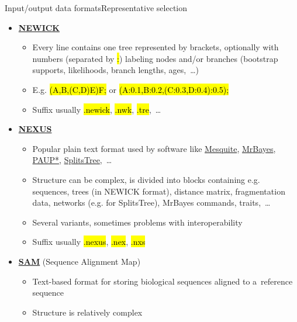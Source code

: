 \documentclass[compress, ucs, xelatex, 11pt, xcolor=svgnames,
	hyperref={
		bookmarks=true,
		unicode=true,
		colorlinks=true,
		pdftitle={Molecular data in R},
		plainpages=false,
		pdfauthor={Vojtech Zeisek},
		pdfsubject={Course about phylogeny and evolution in R},
		pdfcreator={XeLaTeX},
		pdfkeywords={R, evolution, phylogeny, molecular data},
		linkcolor=Tomato,
		anchorcolor=SaddleBrown,
		citecolor=Goldenrod,
		filecolor=DarkMagenta,
		menucolor=Sienna,
		urlcolor=DarkTurquoise,
		pdftex},
	url={hyphens, lowtilde} %
	]{beamer}
\renewcommand{\texttt}[1]{\hl{\ttfamily #1}}
\begin{document}
\begin{frame}[allowframebreaks]{Input/output data formats}{Representative selection}
\begin{itemize}
\begin{itemize}
			\item Common format for output of modern high throughput sequencing machines (e.g. Illumina)
			\item Commonly compressed by \texttt{gzip} (\texttt{*.gz}), sometimes by other compression application
			\item Suffix usually \texttt{*.fastq}, \texttt{*.fq}, \texttt{*.fastq.gz}, \texttt{*.fq.gz},~\ldots
		\end{itemize}
		\item \href{https://en.wikipedia.org/wiki/Newick_format}{\textbf{NEWICK}}
		\begin{itemize}
			\item Every line contains one tree represented by brackets, optionally with numbers (separated by \texttt{:}) labeling nodes and/or branches (bootstrap supports, likelihoods, branch lengths, ages,~\ldots)
			\item E.g. \texttt{(A,B,(C,D)E)F;} or \texttt{(A:0.1,B:0.2,(C:0.3,D:0.4):0.5);}
			\item Suffix usually \texttt{*.newick}, \texttt{*.nwk}, \texttt{*.tre},~\ldots
		\end{itemize}
		\item \href{https://en.wikipedia.org/wiki/Nexus_file}{\textbf{NEXUS}}
		\begin{itemize}
			\item Popular plain text format used by software like \href{https://mesquiteproject.org/}{Mesquite}, \href{https://nbisweden.github.io/MrBayes/}{MrBayes}, \href{https://paup.phylosolutions.com/}{PAUP*}, \href{http://www.splitstree.org/}{SplitsTree},~\ldots
			\item Structure can be complex, is divided into blocks containing e.g. sequences, trees (in NEWICK format), distance matrix, fragmentation data, networks (e.g. for SplitsTree), MrBayes commands, traits,~\ldots
			\item Several variants, sometimes problems with interoperability
			\item Suffix usually \texttt{*.nexus}, \texttt{*.nex}, \texttt{*.nxs}
		\end{itemize}
		\item \href{https://en.wikipedia.org/wiki/SAM_(file_format)}{\textbf{SAM}} (Sequence Alignment Map)
		\begin{itemize}
			\item Text-based format for storing biological sequences aligned to a~reference sequence
			\item Structure is relatively complex

\end{itemize}
\end{itemize}
\end{frame}
\end{document}
